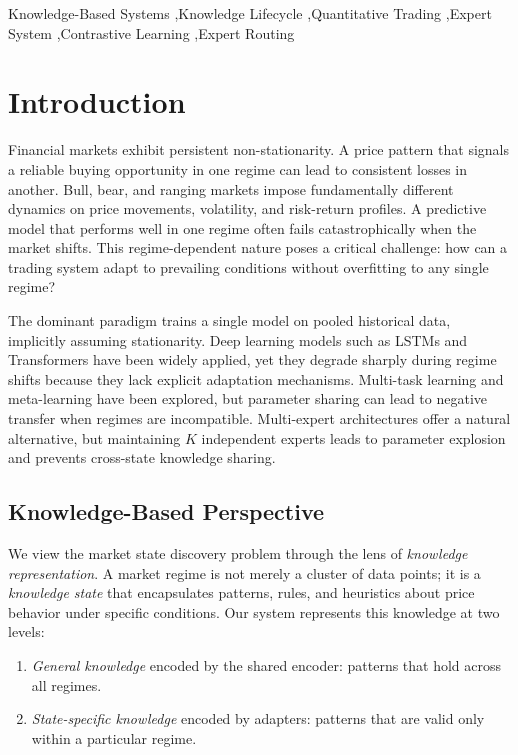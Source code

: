 \documentclass[review]{elsarticle}
\begin{document}
\begin{frontmatter}
\begin{keyword}
Knowledge-Based Systems \sep Knowledge Lifecycle \sep Quantitative Trading \sep Expert System \sep Contrastive Learning \sep Expert Routing
\end{keyword}

\end{frontmatter}

\linenumbers

\section{Introduction}

Financial markets exhibit persistent non-stationarity. A price pattern that signals a reliable buying opportunity in one regime can lead to consistent losses in another. Bull, bear, and ranging markets impose fundamentally different dynamics on price movements, volatility, and risk-return profiles. A predictive model that performs well in one regime often fails catastrophically when the market shifts. This regime-dependent nature poses a critical challenge: how can a trading system adapt to prevailing conditions without overfitting to any single regime?

The dominant paradigm trains a single model on pooled historical data, implicitly assuming stationarity. Deep learning models such as LSTMs \citep{hochreiter1997long} and Transformers \citep{vaswani2017attention} have been widely applied, yet they degrade sharply during regime shifts because they lack explicit adaptation mechanisms. Multi-task learning \citep{caruana1997multitask} and meta-learning \citep{finn2017model} have been explored, but parameter sharing can lead to negative transfer when regimes are incompatible. Multi-expert architectures \citep{jacobs1991adaptive} offer a natural alternative, but maintaining $K$ independent experts leads to parameter explosion and prevents cross-state knowledge sharing.

\subsection{Knowledge-Based Perspective}

We view the market state discovery problem through the lens of \textit{knowledge representation}. A market regime is not merely a cluster of data points; it is a \textit{knowledge state} that encapsulates patterns, rules, and heuristics about price behavior under specific conditions. Our system represents this knowledge at two levels:
\begin{enumerate}
\item \textit{General knowledge} encoded by the shared encoder: patterns that hold across all regimes.
\item \textit{State-specific knowledge} encoded by adapters: patterns that are valid only within a particular regime.
\end{enumerate}
\end{document}
